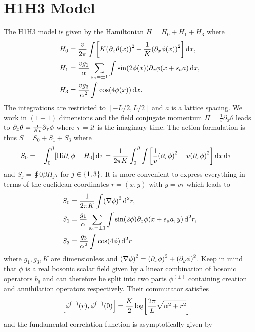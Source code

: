 \documentclass[english, parskip=full]{scrartcl}
\begin{document}
\section{H1H3 Model}
The H1H3 model is given by the Hamiltonian $H=H_0+H_1+H_3$ where
\begin{align}
H_0 &= \frac{v}{2\pi} \intx{ }{ }{\klb*{K\kla*{\partial_x\theta(x)}^2 + \frac{1}{K} \kla*{\partial_x\phi(x)}^2}}{x},\\
H_1 &= \frac{vg_1}{\alpha} \sum_{s_a=\pm 1} \intx{ }{ }{\sin\kla*{2\phi(x)} \partial_x\phi(x+s_aa)}{x},\\
H_3 &= \frac{vg_3}{\alpha^2} \intx{ }{ }{\cos\kla*{4\phi(x)}}{x}.
\end{align}
The integrations are restricted to $[-L/2, L/2]$ and $a$ is a lattice spacing.
We work in $(1+1)$ dimensions and the field conjugate momentum $\Pi = \frac{1}{\pi} \partial_x \theta$ leads to $\partial_x\theta = \frac{\i}{Kv} \partial_\tau\phi$ where $\tau=\i t$ is the imaginary time.
The action formulation is thus $S=S_0 + S_1 + S_3$ where
\begin{align}
S_0 &= -\intx{0}{\beta}{\klb*{\Pi \i\partial_\tau\phi - H_0} }{\tau} = \frac{1}{2\pi K} \intx{0}{\beta}{\intx{ }{ }{\klb*{\frac{1}{v} \kla*{\partial_\tau \phi}^2 + v \kla*{\partial_x \phi}^2}}{x}}{\tau}
\end{align}
and $S_j = \intx{0}{\beta}{H_j}{\tau}$ for $j\in\klc*{1,3}$.
It is more convenient to express everything in terms of the euclidean coordinates $r = (x,y)$ with $y=v\tau$ which leads to
\begin{align}
S_0 &= \frac{1}{2\pi K} \int \kla*{\nabla\phi}^2 \,\d^2r,\\
S_1 &= \frac{g_1}{\alpha} \sum_{s_a=\pm 1} \int \sin \kla*{2 \phi} \partial_x \phi(x+s_aa,y) \,\d^2r,\\
S_3 &= \frac{g_3}{\alpha^2} \int \cos\kla*{4\phi}\,\d^2r
\end{align}
where $g_1,g_3,K$ are dimensionless and $\kla*{\nabla\phi}^2 = \kla*{\partial_x\phi}^2 + \kla*{\partial_y\phi}^2$.
Keep in mind that $\phi$ is a real bosonic scalar field given by a linear combination of bosonic operators $b_q$ and can therefore be split into two parts $\phi^{(\pm)}$ containing creation and annihilation operators respectively.
Their commutator satisfies
\begin{align}
\klb*{\phi^{(+)}(r), \phi^{(-)}(0)} &= \frac{K}{2} \log\klb*{\frac{2\pi}{L} \sqrt{\alpha^2 + r^2}}
\end{align}
and the fundamental correlation function is asymptotically given by
\end{document}
